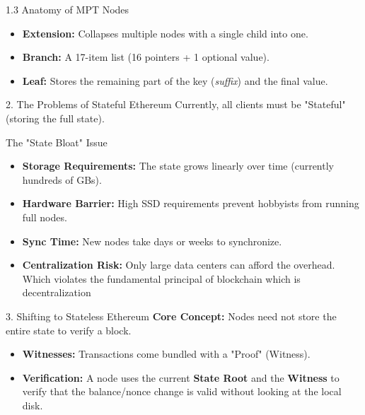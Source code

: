\documentclass{beamer}
\begin{document}
\begin{frame}{1.3 Anatomy of MPT Nodes}
    \vspace{0.3cm}
    \begin{itemize}
        \item \textbf{Extension:} Collapses multiple nodes with a single child into one.
        \item \textbf{Branch:} A 17-item list (16 pointers + 1 optional value).
        \item \textbf{Leaf:} Stores the remaining part of the key (\textit{suffix}) and the final value.
    \end{itemize}
\end{frame}
\begin{frame}{2. The Problems of Stateful Ethereum}
    Currently, all clients must be "Stateful" (storing the full state).
    \begin{block}{The "State Bloat" Issue}
        \begin{itemize}
            \item \textbf{Storage Requirements:} The state grows linearly over time (currently hundreds of GBs).
            \item \textbf{Hardware Barrier:} High SSD requirements prevent hobbyists from running full nodes.
            \item \textbf{Sync Time:} New nodes take days or weeks to synchronize.
            \item \textbf{Centralization Risk:} Only large data centers can afford the overhead. Which violates the fundamental principal of blockchain which is decentralization
        \end{itemize}
    \end{block}
\end{frame}

\begin{frame}{3. Shifting to Stateless Ethereum}
    \textbf{Core Concept:} Nodes need not store the entire state to verify a block.
    \begin{itemize}
        \item \textbf{Witnesses:} Transactions come bundled with a "Proof" (Witness).
        \item \textbf{Verification:} A node uses the current \textbf{State Root} and the \textbf{Witness} to verify that the balance/nonce change is valid without looking at the local disk.
    \end{itemize}
\end{frame}
\end{document}
